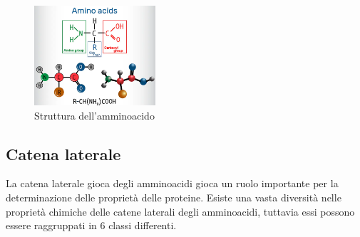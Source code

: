 \begin{figure}
    \centering
    \includegraphics[width=0.4\textwidth]{Immagini/StrutturaAmminoacido.png}
    \caption{Struttura dell'amminoacido}
    \label{fig:Amminoacido}
\end{figure}
\subsection{Catena laterale}\label{subsec:es_subsec}
La catena laterale gioca degli amminoacidi gioca un ruolo importante per la determinazione delle proprietà delle proteine. Esiste una vasta diversità nelle proprietà 
chimiche delle catene laterali degli amminoacidi, tuttavia essi possono essere raggruppati in 6 classi differenti.

\begin{table}[ht]
    \centering
    \vspace*{2mm}
	\caption{Classi di amminoacidi}
	\label{tab:perf}    
\end{table}

